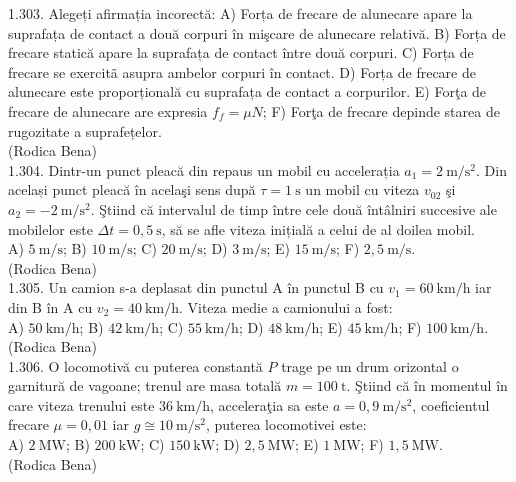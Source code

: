 {1.303. Alegeți afirmația incorectă: A) Forța de frecare de alunecare apare la suprafața de contact a două corpuri în mişcare de alunecare relativă. B) Forța de frecare statică apare la suprafața de contact între două corpuri. C) Forța de frecare se exercitã asupra ambelor corpuri în contact. D) Forța de frecare de alunecare este proporțională cu suprafața de contact a corpurilor. E) Forţa de frecare de alunecare are expresia $f_{f}=\mu N$; F) Forţa de frecare depinde starea de rugozitate a suprafețelor.\\ (Rodica Bena)\\

1.304. Dintr-un punct pleacă din repaus un mobil cu accelerația $a_{1}=2 \mathrm{~m} / \mathrm{s}^{2}$. Din același punct pleacă în acelaşi sens după $\tau=1 \mathrm{~s}$ un mobil cu viteza $v_{02}$ şi $a_{2}=-2 \mathrm{~m} / \mathrm{s}^{2}$. Ştiind că intervalul de timp între cele două întâlniri succesive ale mobilelor este $\Delta t=0,5 \mathrm{~s}$, să se afle viteza inițială a celui de al doilea mobil.\\ A) $5 \mathrm{~m} / \mathrm{s}$; B) $10 \mathrm{~m} / \mathrm{s}$; C) $20 \mathrm{~m} / \mathrm{s}$; D) $3 \mathrm{~m} / \mathrm{s}$; E) $15 \mathrm{~m} / \mathrm{s}$; F) $2,5 \mathrm{~m} / \mathrm{s}$.\\ (Rodica Bena)\\

1.305. Un camion s-a deplasat din punctul A în punctul B cu $v_{1}=60 \mathrm{~km} / \mathrm{h}$ iar din B în A cu $v_{2}=40 \mathrm{~km} / \mathrm{h}$. Viteza medie a camionului a fost:\\ A) $50 \mathrm{~km} / \mathrm{h}$; B) $42 \mathrm{~km} / \mathrm{h}$; C) $55 \mathrm{~km} / \mathrm{h}$; D) $48 \mathrm{~km} / \mathrm{h}$; E) $45 \mathrm{~km} / \mathrm{h}$; F) $100 \mathrm{~km} / \mathrm{h}$.\\ (Rodica Bena)\\

1.306. O locomotivă cu puterea constantă $P$ trage pe un drum orizontal o garnitură de vagoane; trenul are masa totală $m=100 \mathrm{~t}$. Ştiind că în momentul în care viteza trenului este $36 \mathrm{~km} / \mathrm{h}$, acceleraţia sa este $a=0,9 \mathrm{~m} / \mathrm{s}^{2}$, coeficientul frecare $\mu=0,01$ iar $g \cong 10 \mathrm{~m} / \mathrm{s}^{2}$, puterea locomotivei este:\\ A) $2 \mathrm{~MW}$; B) $200 \mathrm{~kW}$; C) $150 \mathrm{~kW}$; D) $2,5 \mathrm{~MW}$; E) $1 \mathrm{~MW}$; F) $1,5 \mathrm{~MW}$.\\ (Rodica Bena)\\

}
